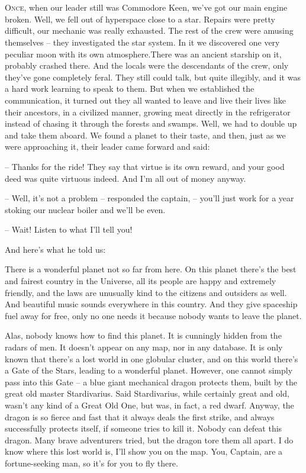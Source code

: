 \documentclass[ebook,oneside,final,openright]{memoir}
\begin{document}
\chapter{}
\par
\lettrine{O}{nce,} when our leader still was Commodore Keen, we’ve got our main engine broken. Well, we fell out of hyperspace close to a star. Repairs were pretty difficult, our mechanic was really exhausted. The rest of the crew were amusing themselves – they investigated the star system. In it we discovered one very peculiar moon with its own atmosphere.There was an ancient starship on it, probably crashed there. And the locals were the descendants of the crew, only they’ve gone completely feral. They still could talk, but quite illegibly, and it was a hard work learning to speak to them. But when we established the communication, it turned out they all wanted to leave and live their lives like their ancestors, in a civilized manner, growing meat directly in the refrigerator instead of chasing it through the forests and swamps. Well, we had to double up and take them aboard. We found a planet to their taste, and then, just as we were approaching it, their leader came forward and said: \par
\par
– Thanks for the ride! They say that virtue is its own reward, and your good deed was quite virtuous indeed. And I’m all out of money anyway.\par
– Well, it’s not a problem – responded the captain, – you’ll just work for a year stoking our nuclear boiler and we’ll be even. \par
– Wait! Listen to what I’ll tell you! \par
 And here’s what he told us:\par
\par
 There is a wonderful planet not so far from here. On this planet there’s the best and fairest country in the Universe, all its people are happy and extremely friendly, and the laws are unusually kind to the citizens and outsiders as well. And beautiful music sounds everywhere in this country. And they give spaceship fuel away for free, only no one needs it because nobody wants to leave the planet. \par
Alas, nobody knows how to find this planet. It is cunningly hidden from the radars of men. It doesn’t appear on any map, nor in any database. It is only known that there’s a lost world in one globular cluster, and on this world there’s a Gate of the Stars, leading to a wonderful planet. However, one cannot simply pass into this Gate – a blue giant mechanical dragon protects them, built by the great old master Stardivarius. Said Stardivarius, while certainly great and old, wasn’t any kind of a Great Old One, but was, in fact, a red dwarf. Anyway, the dragon is so fierce and fast that it always deals the first strike, and always successfully protects itself, if someone tries to kill it. Nobody can defeat this dragon. Many brave adventurers tried, but the dragon tore them all apart. I do know where this lost world is, I’ll show you on the map. You, Captain, are a fortune-seeking man, so it’s for you to fly there.\par
\end{document}
